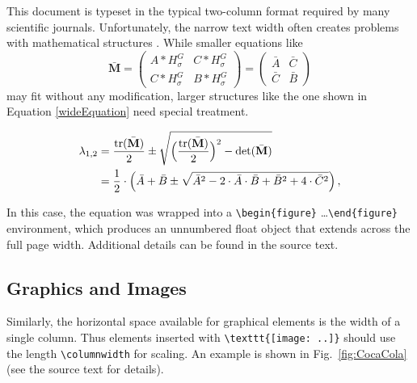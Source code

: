 \documentclass[english,twocolumn,smartquotes]{hgbarticle}
\begin{document}
This document is typeset in the typical two-column format required by many
scientific journals. Unfortunately, the narrow text width often creates problems
with mathematical structures \cite{Voss2014}. 
While smaller equations like
%
\begin{equation}
\bar{\mathbf{M}} =  
\begin{pmatrix}
	A \ast H^{G}_{\sigma}   & C \ast H^{G}_{\sigma} \\
	C \ast H^{G}_{\sigma}   & B \ast H^{G}_{\sigma} 
\end{pmatrix}
=
\begin{pmatrix}
	\bar{A}   & \bar{C} \\
	\bar{C}   & \bar{B} 
\end{pmatrix}
\end{equation}
%
may fit without any modification, larger structures like
the one shown in Equation \ref{wideEquation} need special treatment.
%
\begin{figure}[t]
\begin{equation}
\begin{split}
\lambda_{1,2} 
&= \frac{\mathrm{tr}(\bar{\mathbf{M}})}{2} \pm \sqrt{\Bigl(\frac{\mathrm{tr}(\bar{\mathbf{M}})}{2}\Bigr)^2 
                      - \mathrm{det}(\bar{\mathbf{M}})}  \\
&= \frac{1}{2} \cdot \left( \bar{A} + \bar{B} \pm \sqrt{\bar{A}^2 - 
		2 \cdot \bar{A} \cdot \bar{B} + \bar{B}^2 + 4 \cdot \bar{C}^2} \right) 
		,
\end{split}
\label{wideEquation}
\end{equation}
\end{figure}
%
In this case, the equation was wrapped into a
\verb!\begin{figure}! \ldots \verb!\end{figure}! environment, which produces
an unnumbered float object that extends across the full page width.
Additional details can be found in the source text.

\subsection{Graphics and Images}

Similarly, the horizontal space available for graphical elements is the width
of a single column. Thus elements inserted with \verb!\texttt{[image: ..]}! 
should use the length \verb!\columnwidth! for scaling. An example is shown in
Fig.~\ref{fig:CocaCola} (see the source text for details).
\end{document}
